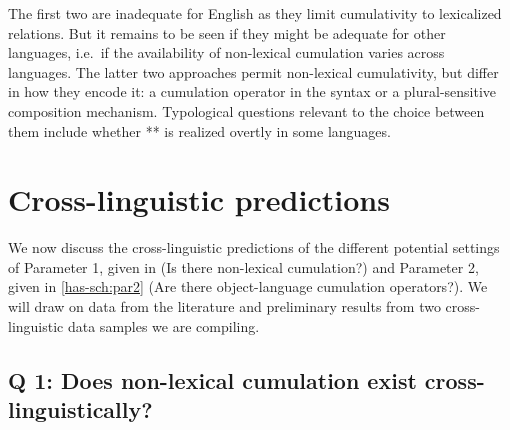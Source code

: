 \documentclass[output=paper]{langscibook}
\begin{document}
The first two are inadequate for English as they limit cumulativity to lexicalized relations. But it remains to be seen if they might be adequate for other languages, i.e.~if the availability of non-lexical cumulation varies across languages. The latter two approaches permit non-lexical cumulativity, but differ in how they encode it: a cumulation operator in the syntax or a plural-sensitive composition mechanism. Typological questions relevant to the choice between them include whether ** is realized overtly in some languages. 

\section{Cross-linguistic predictions}\label{has-sch:sec:3}

We now discuss the cross-linguistic predictions of the different potential settings of Parameter 1, given in  (Is there non-lexical cumulation?) and Parameter 2, given in \ref{has-sch:par2} (Are there object-language cumulation operators?). We  will draw on data from the literature and preliminary results from two cross-linguistic data samples we are compiling.


\subsection{Q 1: Does non-lexical cumulation exist cross-linguistically?} \label{has-sch:sec:3.1}
\end{document}
